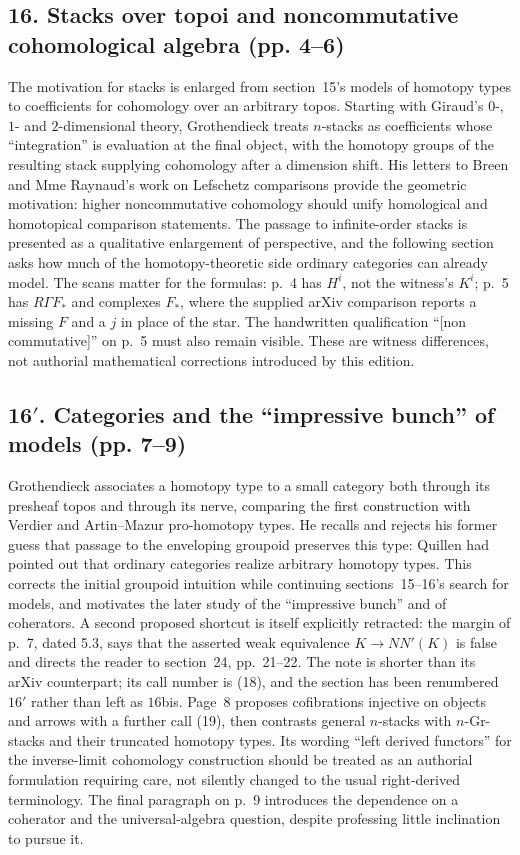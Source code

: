 \documentclass[10pt,oneside]{book}
\begin{document}
\subsection*{16. Stacks over topoi and noncommutative cohomological algebra (pp. 4--6)}
The motivation for stacks is enlarged from section~15's models of homotopy types to coefficients for cohomology over an arbitrary topos. Starting with Giraud's $0$-, $1$- and $2$-dimensional theory, Grothendieck treats $n$-stacks as coefficients whose ``integration'' is evaluation at the final object, with the homotopy groups of the resulting stack supplying cohomology after a dimension shift. His letters to Breen and Mme Raynaud's work on Lefschetz comparisons provide the geometric motivation: higher noncommutative cohomology should unify homological and homotopical comparison statements. The passage to infinite-order stacks is presented as a qualitative enlargement of perspective, and the following section asks how much of the homotopy-theoretic side ordinary categories can already model. The scans matter for the formulas: p.~4 has $H^i$, not the witness's $K^i$; p.~5 has $R\Gamma F_*$ and complexes $F_*$, where the supplied arXiv comparison reports a missing $F$ and a $j$ in place of the star. The handwritten qualification ``[non commutative]'' on p.~5 must also remain visible. These are witness differences, not authorial mathematical corrections introduced by this edition.

\subsection*{16$'$. Categories and the ``impressive bunch'' of models (pp. 7--9)}
Grothendieck associates a homotopy type to a small category both through its presheaf topos and through its nerve, comparing the first construction with Verdier and Artin--Mazur pro-homotopy types. He recalls and rejects his former guess that passage to the enveloping groupoid preserves this type: Quillen had pointed out that ordinary categories realize arbitrary homotopy types. This corrects the initial groupoid intuition while continuing sections~15--16's search for models, and motivates the later study of the ``impressive bunch'' and of coherators. A second proposed shortcut is itself explicitly retracted: the margin of p.~7, dated 5.3, says that the asserted weak equivalence $K\longrightarrow NN'(K)$ is false and directs the reader to section~24, pp.~21--22. The note is shorter than its arXiv counterpart; its call number is (18), and the section has been renumbered $16'$ rather than left as $16$bis. Page~8 proposes cofibrations injective on objects and arrows with a further call (19), then contrasts general $n$-stacks with $n$-Gr-stacks and their truncated homotopy types. Its wording ``left derived functors'' for the inverse-limit cohomology construction should be treated as an authorial formulation requiring care, not silently changed to the usual right-derived terminology. The final paragraph on p.~9 introduces the dependence on a coherator and the universal-algebra question, despite professing little inclination to pursue it.
\end{document}
